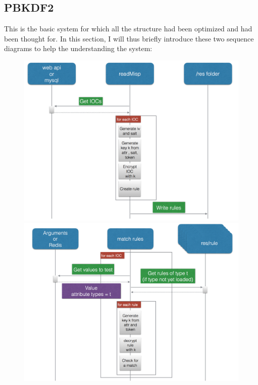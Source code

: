 \documentclass{eplmastersthesis}
\begin{document}
\subsection{PBKDF2}
This is the basic system for which all the structure had been optimized and had been thought for. In this section, I will thus briefly introduce these two sequence diagrams to help the understanding the system:
\begin{figure}[h!]
\begin{center}
   \begin{minipage}[c]{.46\linewidth}
      \includegraphics[scale=0.25]{res/seqDiagramRead}
   \end{minipage} \hfill
   \begin{minipage}[c]{.46\linewidth}
      \includegraphics[scale=0.25]{res/seqDiagramMatch}
   \end{minipage}
\end{center}
\end{figure}
\end{document}
